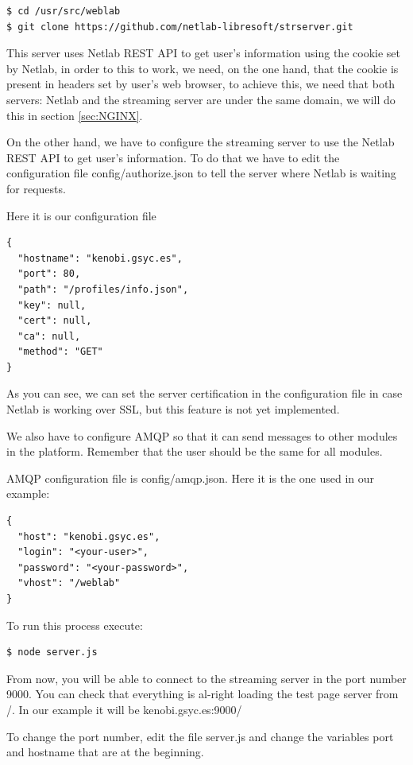 \documentclass{article}
\begin{document}
\begin{verbatim}
$ cd /usr/src/weblab
$ git clone https://github.com/netlab-libresoft/strserver.git
\end{verbatim}

This server uses Netlab REST API to get user's information using the cookie set by Netlab, in order to this to work, we need, on the one hand, that the cookie is present in headers set by user's web browser, to achieve this, we need that both servers: Netlab and the streaming server are under the same domain, we will do this in section \ref{sec:NGINX}.

On the other hand, we have to configure the streaming server to use the Netlab REST API to get user's information. To do that we have to edit the configuration file config/authorize.json to tell the server where Netlab is waiting for requests.

Here it is our configuration file
\begin{verbatim}
{
  "hostname": "kenobi.gsyc.es",
  "port": 80,
  "path": "/profiles/info.json",
  "key": null,
  "cert": null,
  "ca": null,
  "method": "GET"
}
\end{verbatim}

As you can see, we can set the server certification in the configuration file in case Netlab is working over SSL, but this feature is not yet implemented.

We also have to configure AMQP so that it can send messages to other modules in the platform. Remember that the user should be the same for all modules.

AMQP configuration file is config/amqp.json. Here it is the one used in our example:
\begin{verbatim}
{
  "host": "kenobi.gsyc.es",
  "login": "<your-user>",
  "password": "<your-password>",
  "vhost": "/weblab"
}
\end{verbatim}

To run this process execute:

\begin{verbatim}
$ node server.js
\end{verbatim}

From now, you will be able to connect to the streaming server in the port number 9000. You can check that everything is al-right loading the test page server from /. In our example it will be kenobi.gsyc.es:9000/

To change the port number, edit the file server.js and change the variables port and hostname that are at the beginning.
\end{document}
